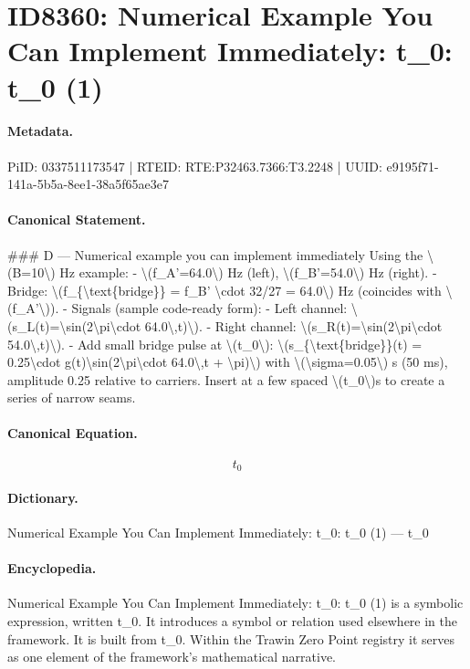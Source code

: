 \section*{ID8360: Numerical Example You Can Implement Immediately: t\_0: t\_0 (1)}
\paragraph{Metadata.}
PiID: 0337511173547 | RTEID: RTE:P32463.7366:T3.2248 | UUID: e9195f71-141a-5b5a-8ee1-38a5f65ae3e7

\paragraph{Canonical Statement.}
\#\#\# D — Numerical example you can implement immediately Using the \textbackslash{}(B=10\textbackslash{}) Hz example: - \textbackslash{}(f\_A'=64.0\textbackslash{}) Hz (left), \textbackslash{}(f\_B'=54.0\textbackslash{}) Hz (right). - Bridge: \textbackslash{}(f\_\{\textbackslash{}text\{bridge\}\} = f\_B' \textbackslash{}cdot 32/27 = 64.0\textbackslash{}) Hz (coincides with \textbackslash{}(f\_A'\textbackslash{})). - Signals (sample code-ready form): - Left channel: \textbackslash{}(s\_L(t)=\textbackslash{}sin(2\textbackslash{}pi\textbackslash{}cdot 64.0\textbackslash{},t)\textbackslash{}). - Right channel: \textbackslash{}(s\_R(t)=\textbackslash{}sin(2\textbackslash{}pi\textbackslash{}cdot 54.0\textbackslash{},t)\textbackslash{}). - Add small bridge pulse at \textbackslash{}(t\_0\textbackslash{}): \textbackslash{}(s\_\{\textbackslash{}text\{bridge\}\}(t) = 0.25\textbackslash{}cdot g(t)\textbackslash{}sin(2\textbackslash{}pi\textbackslash{}cdot 64.0\textbackslash{},t + \textbackslash{}pi)\textbackslash{}) with \textbackslash{}(\textbackslash{}sigma=0.05\textbackslash{}) s (50 ms), amplitude 0.25 relative to carriers. Insert at a few spaced \textbackslash{}(t\_0\textbackslash{})s to create a series of narrow seams.

\paragraph{Canonical Equation.}
\[
t_0
\]

\paragraph{Dictionary.}
Numerical Example You Can Implement Immediately: t\_0: t\_0 (1) — t\_0

\paragraph{Encyclopedia.}
Numerical Example You Can Implement Immediately: t\_0: t\_0 (1) is a symbolic expression, written t\_0. It introduces a symbol or relation used elsewhere in the framework. It is built from t\_0. Within the Trawin Zero Point registry it serves as one element of the framework's mathematical narrative.

